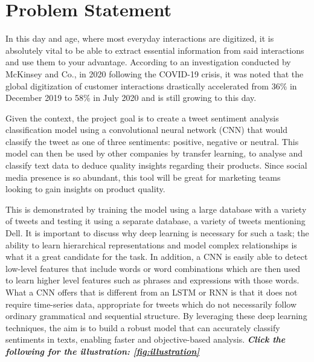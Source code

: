 \section{Problem Statement}

In this day and age, where most everyday interactions are digitized, it is absolutely vital to be able to extract essential information from said interactions and use them to your advantage. According to an investigation conducted by McKinsey and Co.,\cite{mckinsey} in 2020 following the COVID-19 crisis, it was noted that the global digitization of customer interactions drastically accelerated from 36\% in December 2019 to 58\% in July 2020 and is still growing to this day. %

Given the context, the project goal is to create a tweet sentiment analysis classification model using a convolutional neural network (CNN) that would classify the tweet as one of three sentiments: positive, negative or neutral. This model can then be used by other companies by transfer learning, to analyse and classify text data to deduce quality insights regarding their products. Since social media presence is so abundant, this tool will be great for marketing teams looking to gain insights on product quality. 

This is demonstrated by training the model using a large database with a variety of tweets and testing it using a separate database, a variety of tweets mentioning Dell. It is important to discuss why deep learning is necessary for such a task; the ability to learn hierarchical representations and model complex relationships is what it a great candidate for the task. In addition, a CNN is easily able to detect low-level features that include words or word combinations which are then used to learn higher level features such as phrases and expressions with those words. What a CNN offers that is different from an LSTM or RNN is that it does not require time-series data, appropriate for tweets which do not necessarily follow ordinary grammatical and sequential structure. By leveraging these deep learning techniques, the aim is to build a robust model that can accurately classify sentiments in texts, enabling faster and objective-based analysis. \textbf{\textit{Click the following for the illustration: \ref{fig:illustration}}}



